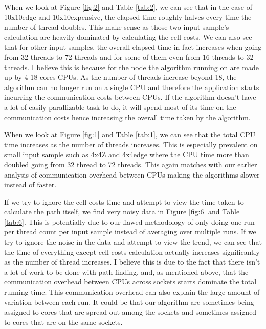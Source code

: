 \documentclass{article}
\begin{document}
When we look at Figure \ref{fig:2} and Table \ref{tab:2}, we can see that in the case of 10x10edge
and 10x10expensive, the elapsed time roughly halves every time the number of thread doubles. This
make sense as those two input sample's calculation are heavily dominated by calculating the cell
costs. We can also see that for other input samples, the overall elapsed time in fact increases when
going from 32 threads to 72 threads and for some of them even from 16 threads to 32 threads. I
believe this is because for the node the algorithm running on are made up by 4 18 cores CPUs. As the
number of threads increase beyond 18, the algorithm can no longer run on a single CPU and therefore
the application starts incurring the communication costs between CPUs. If the algorithm doesn't
have a lot of easily parallizable task to do, it will spend most of its time on the communication
costs hence increasing the overall time taken by the algorithm.

When we look at Figure \ref{fig:1} and Table \ref{tab:1}, we can see that the total CPU time
increases as the number of threads increases. This is especially prevalent on small input sample
such as 4x4Z and 4x4edge where the CPU time more than doubled going from 32 thread to 72 threads.
This again matches with our earlier analysis of communication overhead between CPUs making the
algorithms slower instead of faster.

If we try to ignore the cell costs time and attempt to view the time taken to calculate the path
itself, we find very noisy data in Figure \ref{fig:6} and Table \ref{tab:6}. This is potentially due
to our flawed methodology of only doing one run per thread count per input sample instead of
averaging over multiple runs. If we try to ignore the noise in the data and attempt to view the
trend, we can see that the time of everything except cell costs calculation actually increases
significantly as the number of thread increases. I believe this is due to the fact that there isn't
a lot of work to be done with path finding, and, as mentioned above, that the communication overhead
between CPUs across sockets starts dominate the total running time. This communication overhead can
also explain the large amount of variation between each run. It could be that our algorithm are
sometimes being assigned to cores that are spread out among the sockets and sometimes assigned to
cores that are on the same sockets.
\end{document}
